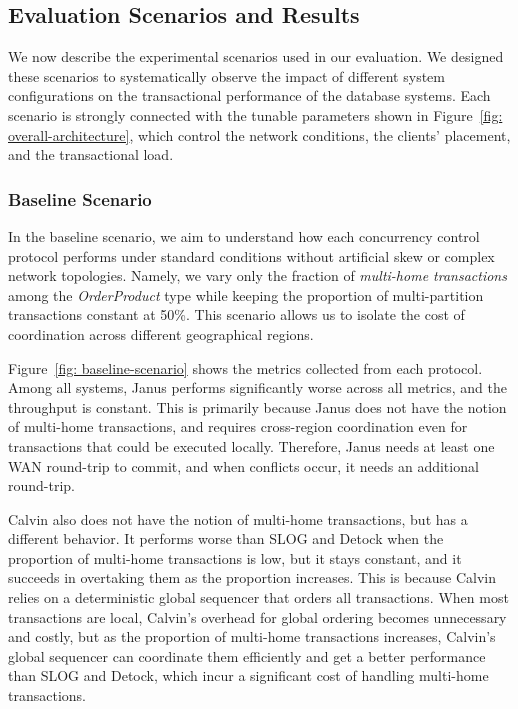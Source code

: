 \subsection{Evaluation Scenarios and Results}
\label{subsec: evaluation-scenarios-and-results}
We now describe the experimental scenarios used in our evaluation. We designed these scenarios to systematically observe the impact of different system configurations on the transactional performance of the database systems. Each scenario is strongly connected with the tunable parameters shown in Figure~\ref{fig: overall-architecture}, which control the network conditions, the clients' placement, and the transactional load.

\subsubsection{Baseline Scenario}
\label{subsubsec: baseline-scenario}
In the baseline scenario, we aim to understand how each concurrency control protocol performs under standard conditions without artificial skew or complex network topologies. Namely, we vary only the fraction of \textit{multi-home transactions} among the \textit{OrderProduct} type while keeping the proportion of multi-partition transactions constant at 50\%. This scenario allows us to isolate the cost of coordination across different geographical regions.

Figure~\ref{fig: baseline-scenario} shows the metrics collected from each protocol. Among all systems, Janus performs significantly worse across all metrics, and the throughput is constant. This is primarily because Janus does not have the notion of multi-home transactions, and requires cross-region coordination even for transactions that could be executed locally. Therefore, Janus needs at least one WAN round-trip to commit, and when conflicts occur, it needs an additional round-trip.

Calvin also does not have the notion of multi-home transactions, but has a different behavior. It performs worse than SLOG and Detock when the proportion of multi-home transactions is low, but it stays constant, and it succeeds in overtaking them as the proportion increases. This is because Calvin relies on a deterministic global sequencer that orders all transactions. When most transactions are local, Calvin's overhead for global ordering becomes unnecessary and costly, but as the proportion of multi-home transactions increases, Calvin's global sequencer can coordinate them efficiently and get a better performance than SLOG and Detock, which incur a significant cost of handling multi-home transactions.  


